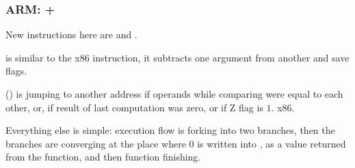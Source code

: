 \subsubsection{ARM: \OptimizingKeil + \ThumbMode}



{New instructions here are \CMP and .}

\CMP {}
{is similar to the x86 instruction, it subtracts one argument from another and save flags.}

 () 
{is jumping to another address if operands while comparing were equal to each other, or,
if result of last computation was zero, or if Z flag is $1$.}
 x86.

{Everything else is simple: execution flow is forking into two branches, then the branches are 
converging at the place
where $0$ is written into \Rzero, as a value returned from the function, and then function finishing.}

